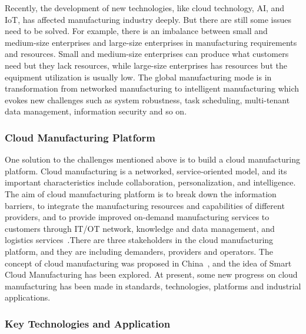 \documentclass[letterpaper, twocolumn, 10pt, conference]{IEEEtran}
\begin{document}
Recently, the development of new technologies, like cloud technology, AI, and IoT, has affected manufacturing industry deeply. But there are still some issues need to be solved. For example, there is an imbalance between small and medium-size enterprises and large-size enterprises in manufacturing requirements and resources. Small and medium-size enterprises can produce what customers need but they lack resources, while large-size enterprises has resources but the equipment utilization is usually low. The global manufacturing mode is in transformation from networked manufacturing to intelligent manufacturing which evokes new challenges such as system robustness, task scheduling, multi-tenant data management, information security and so on. 

\subsubsection{Cloud Manufacturing Platform}

One solution to the challenges mentioned above is to build a cloud manufacturing platform. 
Cloud manufacturing is a networked, service-oriented model, and its important characteristics include collaboration, personalization, and intelligence. The aim of cloud manufacturing platform is to break down the information barriers, to integrate the manufacturing resources and capabilities of different providers, and to provide improved on-demand manufacturing services to customers through IT/OT network, knowledge and data management, and logistics services~\cite{zhou2018modelling}.There are three stakeholders in the cloud manufacturing platform, and they are including demanders, providers and operators. The concept of cloud manufacturing was proposed in China~\cite{li2010cloud}, and the idea of Smart Cloud Manufacturing has been explored.  At present, some new progress on cloud manufacturing has been made in standards, technologies, platforms and industrial applications. 

\subsubsection{Key Technologies and Application}
\end{document}
